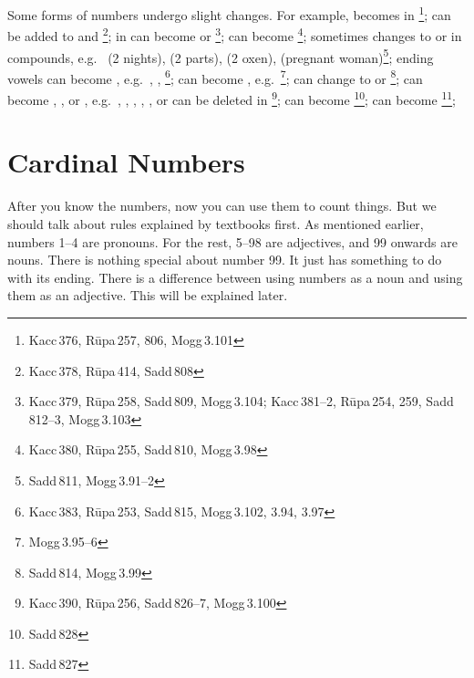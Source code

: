 Some forms of numbers undergo slight changes. For example,  becomes  in \footnote{Kacc\,376, R\=upa\,257, 806, Mogg\,3.101};  can be added to  and \footnote{Kacc\,378, R\=upa\,414, Sadd\,808};  in  can become  or \footnote{Kacc\,379, R\=upa\,258, Sadd\,809, Mogg\,3.104; Kacc\,381--2, R\=upa\,254, 259, Sadd\,812--3, Mogg\,3.103};  can become \footnote{Kacc\,380, R\=upa\,255, Sadd\,810, Mogg\,3.98}; sometimes  changes to  or  in compounds, e.g.\  (2 nights),  (2 parts),  (2 oxen),  (pregnant woman)\footnote{Sadd\,811, Mogg\,3.91--2}; ending vowels can become , e.g.\ , , \footnote{Kacc\,383, R\=upa\,253, Sadd\,815, Mogg\,3.102, 3.94, 3.97};  can become , e.g.\ \footnote{Mogg\,3.95--6};  can change to  or \footnote{Sadd\,814, Mogg\,3.99};  can become , , or , e.g.\ , , , , , or can be deleted in \footnote{Kacc\,390, R\=upa\,256, Sadd\,826--7, Mogg\,3.100};  can become \footnote{Sadd\,828};  can become \footnote{Sadd\,827};

{}
\section*{Cardinal Numbers}

After you know the numbers, now you can use them to count things. But we should talk about rules explained by textbooks first. As mentioned earlier, numbers 1--4 are pronouns. For the rest, 5--98 are adjectives, and 99 onwards are nouns. There is nothing special about number 99. It just has something to do with its ending. There is a difference between using numbers as a noun and using them as an adjective. This will be explained later.

